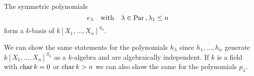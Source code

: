 \begin{corollary}
  The symmetric polynomials
  \[
      e_\lambda
    \quad\text{with}\quad
      \lambda \in \operatorname{Par} \,,
      \lambda_1 \leq n
  \]
  form a $k$-basis of $k[X_1, \dotsc, X_n]^{S_n}$.
\end{corollary}


\begin{remark}
  We can show the same statements for the polynomials $h_\lambda$ since $h_1, \dotsc, h_n$ generate $k[X_1, \dotsc, X_n]^{S_n}$ as a $k$-algebra and are algebraically independent.
  If $k$ is a field with $\operatorname{char} k = 0$ or $\operatorname{char} k > n$ we can also show the same for the polynomials $p_\lambda$.
\end{remark}


